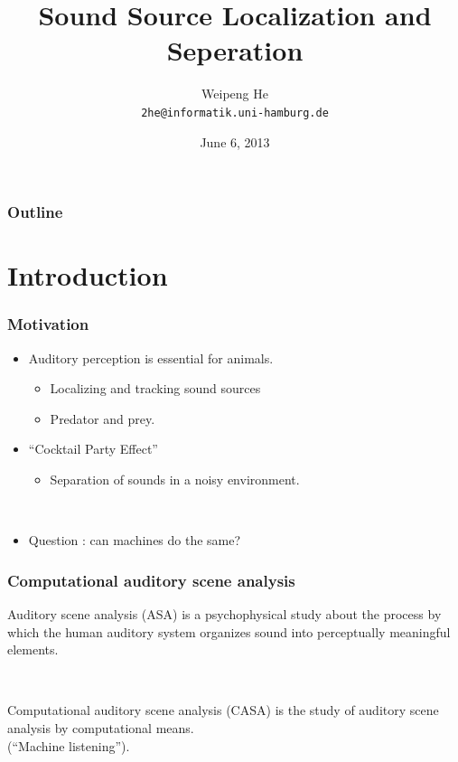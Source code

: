 \documentclass{beamer}
\title{Sound Source Localization and Seperation}
\author{Weipeng He \\ \texttt{2he@informatik.uni-hamburg.de}}
\date{June 6, 2013}
\begin{document}
\frame{\titlepage}

\begin{frame}
\frametitle{Outline}
\tableofcontents
\end{frame}

\section{Introduction}

\begin{frame}
\frametitle{Motivation}

\begin{itemize}
  \item Auditory perception is essential for animals.
  \begin{itemize}
    \item Localizing and tracking sound sources
    \item Predator and prey.
  \end{itemize}
  \item ``Cocktail Party Effect''
  \begin{itemize}
    \item Separation of sounds in a noisy environment.
  \end{itemize}
  ~
  \item Question : can machines do the same?
\end{itemize}
\end{frame}

\begin{frame}
\frametitle{Computational auditory scene analysis}
\begin{block}{Auditory scene analysis (ASA)}
    is a psychophysical study about the process by which the human auditory system organizes sound into perceptually meaningful elements.
  \end{block}
  ~
  \begin{block}{Computational auditory scene analysis (CASA)}
    is the study of auditory scene analysis by computational means. \\
    (``Machine listening'').
  \end{block}
\end{frame}
\end{document}
